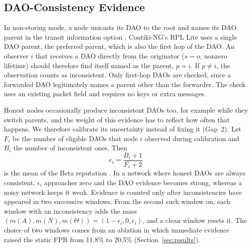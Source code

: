 \subsection{DAO-Consistency Evidence}
In non-storing mode, a node unicasts its DAO to the root and names its DAO parent in the transit information option \cite{rfc6550}. Contiki-NG's RPL Lite uses a single DAO parent, the preferred parent, which is also the first hop of the DAO. An observer $i$ that receives a DAO directly from the originator ($s=o$, nonzero lifetime) should therefore find itself named as the parent, $p=i$. If $p\neq i$, the observation counts as inconsistent. Only first-hop DAOs are checked, since a forwarded DAO legitimately names a parent other than the forwarder. The check uses an existing packet field and requires no keys or extra messages.

Honest nodes occasionally produce inconsistent DAOs too, for example while they switch parents, and the weight of this evidence has to reflect how often that happens. We therefore calibrate its uncertainty instead of fixing it (Gap~2). Let $F_i$ be the number of eligible DAOs that node $i$ observed during calibration and $B_i$ the number of inconsistent ones. Then
\begin{equation}
 \epsilon_i=\frac{B_i+1}{F_i+2}
\end{equation}
is the mean of the Beta reputation \cite{ganeriwal2008}. In a network where honest DAOs are always consistent, $\epsilon_i$ approaches zero and the DAO evidence becomes strong, whereas a noisy network keeps it weak. Evidence is counted only after inconsistencies have appeared in two successive windows. From the second such window on, each window with an inconsistency adds the mass $(m(A),m(N),m(\Theta))=(1-\epsilon_i,0,\epsilon_i)$, and a clean window resets it. The choice of two windows comes from an ablation in which immediate evidence raised the static FPR from 11.8\% to 20.5\% (Section~\ref{sec:results}).

